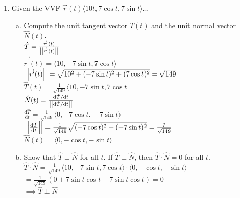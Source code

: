 \begin{enumerate}
	\item Given the VVF $\vec{r}(t)\langle 10t, 7\cos{t}, 7\sin{t}\rangle$...\\
	\begin{enumerate}[a.]
		\item Compute the unit tangent vector $\hat{T}(t)$ and the unit normal vector $\hat{N}(t)$.\\
		\indent
		$\hat{T}=\frac{\vec{r^\prime}(t)}{\left|\left|\vec{r^\prime}(t)\right|\right|}$\\
		$\vec{r^\prime}(t)=\langle 10,-7\sin{t},7\cos{t}\rangle$\\
		$\left|\left|\vec{r^\prime}(t)\right|\right|=\sqrt{10^2+(-7\sin{t})^2+(7\cos{t})^2}=\sqrt{149}$\\
		$\hat{T}(t)=\frac{1}{\sqrt{149}}\langle 10,-7\sin{t},7\cos{t}$\\
		$\hat{N}(t)=\frac{\mathrm{d}\hat{T}/\mathrm{d}t}{\left|\left|\mathrm{d}\hat{T}/\mathrm{d}t\right|\right|}$\\
		$\frac{\mathrm{d}\hat{T}}{\mathrm{d}t}=\frac{1}{\sqrt{149}}\langle 0,-7\cos{t}.-7\sin{t}\rangle$\\
		$\left|\left|\frac{\mathrm{d}\hat{T}}{\mathrm{d}t}\right|\right|=\frac{1}{\sqrt{149}}\sqrt{(-7\cos{t})^2+(-7\sin{t})^2}=\frac{7}{\sqrt{149}}$\\
		$\hat{N}(t)=\langle 0,-\cos{t},-\sin{t}\rangle$
		
		\item Show that $\hat{T}\perp\hat{N}$ for all $t$.
		\indent
		If $\hat{T}\perp\hat{N}$, then $\hat{T}\cdot\hat{N}=0$ for all $t$.\\
		$\hat{T}\cdot\hat{N}=\frac{1}{\sqrt{149}}\langle 10, -7\sin{t}, 7\cos{t}\rangle\cdot\langle 0,-\cos{t},-\sin{t}\rangle$\\
		$=\frac{1}{\sqrt{149}}(0+7\sin{t}\cos{t}-7\sin{t}\cos{t})=0$\\
		$\implies \hat{T}\perp\hat{N}$\\
	\end{enumerate}
	

\end{enumerate}
